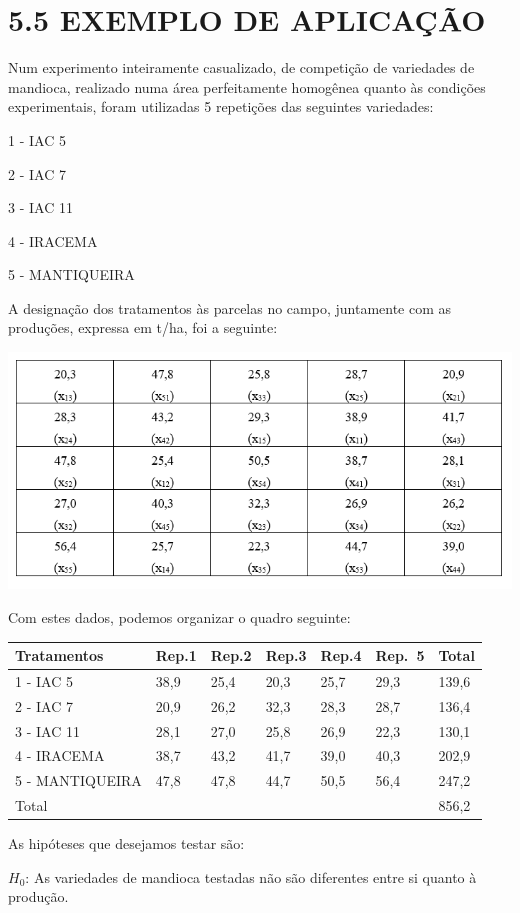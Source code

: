 \documentclass[
]{book}
\begin{document}
\hypertarget{exemplo-de-aplicauxe7uxe3o}{%
\section{5.5 EXEMPLO DE APLICAÇÃO}\label{exemplo-de-aplicauxe7uxe3o}}

Num experimento inteiramente casualizado, de competição de variedades de mandioca, realizado numa área perfeitamente homogênea quanto às condições experimentais, foram utilizadas 5 repetições das seguintes variedades:

1 - IAC 5

2 - IAC 7

3 - IAC 11

4 - IRACEMA

5 - MANTIQUEIRA

A designação dos tratamentos às parcelas no campo, juntamente com as produções, expressa em t/ha, foi a seguinte:

\includegraphics{Delin1.png}

Com estes dados, podemos organizar o quadro seguinte:

\begin{longtable}[]{@{}lllllll@{}}
\toprule
Tratamentos & Rep.1 & Rep.2 & Rep.3 & Rep.4 & Rep.~5 & Total\tabularnewline
\midrule
\endhead
1 - IAC 5 & 38,9 & 25,4 & 20,3 & 25,7 & 29,3 & 139,6\tabularnewline
2 - IAC 7 & 20,9 & 26,2 & 32,3 & 28,3 & 28,7 & 136,4\tabularnewline
3 - IAC 11 & 28,1 & 27,0 & 25,8 & 26,9 & 22,3 & 130,1\tabularnewline
4 - IRACEMA & 38,7 & 43,2 & 41,7 & 39,0 & 40,3 & 202,9\tabularnewline
5 - MANTIQUEIRA & 47,8 & 47,8 & 44,7 & 50,5 & 56,4 & 247,2\tabularnewline
Total & & & & & & 856,2\tabularnewline
\bottomrule
\end{longtable}

As hipóteses que desejamos testar são:

\(H_0\): As variedades de mandioca testadas não são diferentes entre si quanto à produção.
\end{document}
